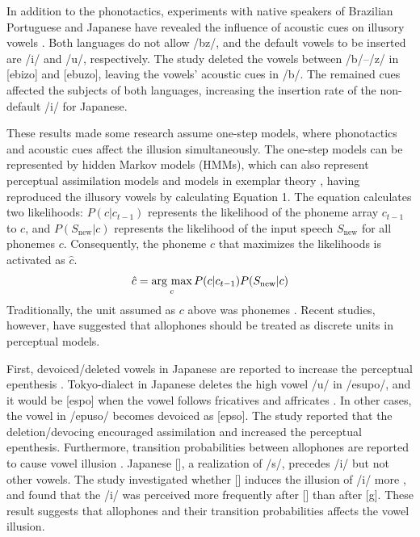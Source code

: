 \documentclass[a4paper,11pt,twocolumn]{article}
\newcommand{\argmax}{\mathop{\rm arg~max}\limits}
\begin{document}
In addition to the phonotactics, experiments with native speakers of Brazilian Portuguese and Japanese have revealed the influence of acoustic cues on illusory vowels \cite{dupoux2011illusory}. Both languages do not allow /bz/, and the default vowels to be inserted are /i/ and /u/, respectively. The study deleted the vowels between /b/--/z/ in [ebizo] and [ebuzo], leaving the vowels' acoustic cues in /b/. The remained cues affected the subjects of both languages, increasing the insertion rate of the non-default /i/ for Japanese.

These results made some research assume one-step models, where phonotactics and acoustic cues affect the illusion simultaneously. The one-step models can be represented by hidden Markov models (HMMs), which can also represent perceptual assimilation models \cite{best2001discrimination} and models in exemplar theory \cite{lacerda1995perceptual}, having reproduced the illusory vowels \cite{kishiyama2021influence} by calculating Equation 1. The equation calculates two likelihoods: $P(c|c_{t-1})$ represents the likelihood of the phoneme array $c_{t-1}$ to $c$, and $P(S_{\text{new}}|c)$ represents the likelihood of the input speech $S_{\text{new}}$ for all phonemes $c$. Consequently, the phoneme $c$ that maximizes the likelihoods is activated as $\hat{c}$.
\begin{equation} \label{hmm}
    \hat{c} = \argmax_{c} P(c | c_{t-1})P(S_{\text{new}}|c)
\end{equation}
Traditionally, the unit assumed as $c$ above was phonemes \cite{wilson2013bayesian}. Recent studies, however, have suggested that allophones should be treated as discrete units in perceptual models.

First, devoiced/deleted vowels in Japanese are reported to increase the perceptual epenthesis \cite{kilpatrick2018japanese}. Tokyo-dialect in Japanese deletes the high vowel /u/ in /esupo/, and it would be [espo] when the vowel follows fricatives and affricates \cite{fujimoto2003devoice_eng, shaw2018lingual}. In other cases, the vowel in /epuso/ becomes devoiced as [ep\textsubring{\textturnm}so]. The study reported that the deletion/devocing encouraged assimilation and increased the perceptual epenthesis. Furthermore, transition probabilities between allophones are reported to cause vowel illusion \cite{kilpatrick2020japanese}. Japanese [\textctc], a realization of /s/, precedes /i/ but not other vowels. The study investigated whether [\textctc{}] induces the illusion of /i/ more \cite{kilpatrick2020japanese}, and found that the /i/ was perceived more frequently after [\textctc] than after [g]. These result suggests that allophones and their transition probabilities affects the vowel illusion.
\end{document}
